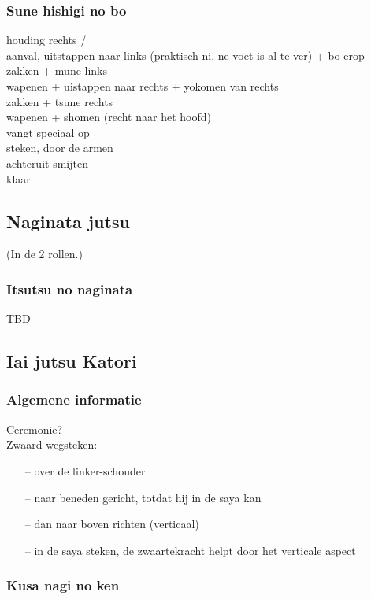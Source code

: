 \subsubsection{Sune hishigi no bo}

houding rechts /\\
aanval, uitstappen naar links (praktisch ni, ne voet is al te ver) + bo erop\\
zakken + mune links\\
wapenen + uistappen naar rechts + yokomen van rechts\\
zakken + tsune rechts\\
wapenen + shomen (recht naar het hoofd)\\
vangt speciaal op\\
steken, door de armen\\
achteruit smijten\\
klaar

\subsection{Naginata jutsu}
(In de 2 rollen.)

\subsubsection{Itsutsu no naginata}

TBD

\subsection{Iai jutsu Katori}

\subsubsection{Algemene informatie}

Ceremonie?\\

Zwaard wegsteken:
\begin{itemize}
\item[--] over de linker-schouder
\item[--] naar beneden gericht, totdat hij in de saya kan
\item[--] dan naar boven richten (verticaal)
\item[--] in de saya steken, de zwaartekracht helpt door het verticale aspect
\end{itemize}


\subsubsection{Kusa nagi no ken}

